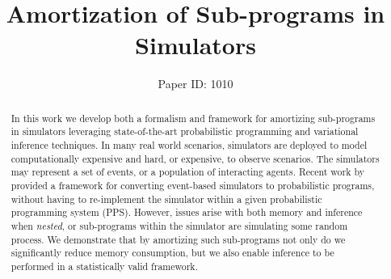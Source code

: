 \documentclass{article}
\title{Amortization of Sub-programs in Simulators }%
\author{%
Paper ID: 1010 }
\begin{document}

\maketitle

\begin{abstract}

  In this work we develop both a formalism and framework for amortizing sub-programs
  in simulators leveraging state-of-the-art probabilistic programming and variational inference techniques.
  In many real world scenarios, simulators are deployed to model computationally expensive
  and hard, or expensive, to observe scenarios.
  The simulators may represent a set of events, or a population of interacting agents. 
  Recent work by \citet{baydin2018efficient} provided a framework for converting event-based simulators 
  to probabilistic programs, without having to re-implement the simulator within a given probabilistic
  programming system (PPS).
  However, issues arise with both memory and inference when \emph{nested}, or sub-programs within the simulator are simulating 
  some random process. 
  We demonstrate that by amortizing such sub-programs not only do we significantly reduce memory consumption, but
  we also enable inference to be performed in a statistically valid framework. 
\end{abstract}
\end{document}
